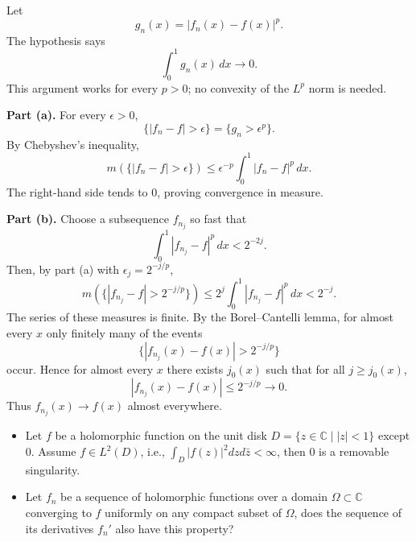 \begin{solution}
Let
\[
g_n(x)=|f_n(x)-f(x)|^p.
\]
The hypothesis says
\[
\int_0^1 g_n(x)\,dx\to 0.
\]
This argument works for every $p>0$; no convexity of the $L^p$ norm is needed.

\textbf{Part (a).}
For every $\epsilon>0$,
\[
\{|f_n-f|>\epsilon\}=\{g_n>\epsilon^p\}.
\]
By Chebyshev's inequality,
\[
m(\{|f_n-f|>\epsilon\})
\leq \epsilon^{-p}\int_0^1 |f_n-f|^p\,dx.
\]
The right-hand side tends to $0$, proving convergence in measure.

\textbf{Part (b).}
Choose a subsequence $f_{n_j}$ so fast that
\[
\int_0^1 |f_{n_j}-f|^p\,dx<2^{-2j}.
\]
Then, by part (a) with $\epsilon_j=2^{-j/p}$,
\[
m\left(\{|f_{n_j}-f|>2^{-j/p}\}\right)
\leq 2^j\int_0^1 |f_{n_j}-f|^p\,dx
<2^{-j}.
\]
The series of these measures is finite. By the Borel--Cantelli lemma, for almost every $x$ only finitely many of the events
\[
\{|f_{n_j}(x)-f(x)|>2^{-j/p}\}
\]
occur. Hence for almost every $x$ there exists $j_0(x)$ such that for all $j\geq j_0(x)$,
\[
|f_{n_j}(x)-f(x)|\leq 2^{-j/p}\to 0.
\]
Thus $f_{n_j}(x)\to f(x)$ almost everywhere.
\end{solution}

\begin{exercise}
\label{analysis:2016:9}
\begin{itemize}
    \item[1)] Let $f$ be a holomorphic function on the unit disk $D = \{ z \in \mathbb{C} \mid |z| < 1 \}$ except 0. Assume $f \in L^2(D)$, i.e., $\int_D |f(z)|^2 dz d\bar{z} < \infty$, then 0 is a removable singularity.
    \item[2)] Let $f_n$ be a sequence of holomorphic functions over a domain $\Omega \subset \mathbb{C}$ converging to $f$ uniformly on any compact subset of $\Omega$, does the sequence of its derivatives $f_n'$ also have this property?
\end{itemize}
\end{exercise}

